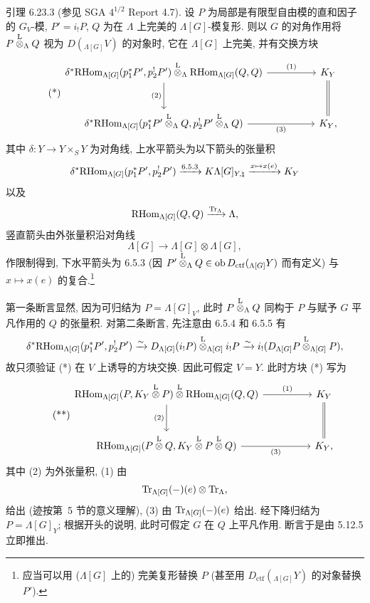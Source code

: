 \begin{statement}{引理 6.23.3}
(参见 SGA $4^{1/2}$ Report 4.7). 设 $P$ 为局部是有限型自由模的直和因子的 $G_V$-模, $P'=i_!P$, $Q$ 为在 $\Lambda$ 上完美的 $\Lambda[G]$-模复形. 则以 $G$ 的对角作用将 $P\overset{\mathrm L}{\otimes}_{\Lambda}Q$ 视为 $D({}_{\Lambda[G]}V)$ 的对象时, 它在 $\Lambda[G]$ 上完美, 并有交换方块
\begin{equation}\tag{*}
\begin{tikzcd}[column sep=huge,row sep=large]
\delta^*\RHom_{\Lambda[G]}(p_1^*P',p_2^!P')\lten_{\Lambda}
\RHom_{\Lambda[G]}(Q,Q) \arrow[r,"(1)"] \arrow[d,"(2)"']
& K_Y \arrow[d,equal]\\
\delta^*\RHom_{\Lambda[G]}(p_1^*P'\lten_{\Lambda}Q,p_2^!P'\lten_{\Lambda}Q) \arrow[r,"(3)"']
& K_Y ,
\end{tikzcd}
\end{equation}
其中 $\delta:Y\to Y\times_SY$ 为对角线, 上水平箭头为以下箭头的张量积
\[
\delta^*\mathrm{RHom}_{\Lambda[G]}(p_1^*P',p_2^!P')\xrightarrow{6.5.3}
K\Lambda[G]_{Y,\natural}\xrightarrow{x\mapsto x(e)}K_Y
\]
以及
\[
\mathrm{RHom}_{\Lambda[G]}(Q,Q)\xrightarrow{\operatorname{Tr}_{\Lambda}}\Lambda,
\]
竖直箭头由外张量积沿对角线
\[
\Lambda[G]\to\Lambda[G]\otimes\Lambda[G],
\]
作限制得到, 下水平箭头为 6.5.3 (因 $P'\overset{\mathrm L}{\otimes}_{\Lambda}Q\in\operatorname{ob} D_{\mathrm{ctf}}({}_{\Lambda[G]}Y)$ 而有定义) 与 $x\mapsto x(e)$ 的复合.\footnote{应当可以用 ($\Lambda[G]$ 上的) 完美复形替换 $P$ (甚至用 $D_{\mathrm{ctf}}({}_{\Lambda[G]}Y)$ 的对象替换 $P'$).}
\end{statement}

第一条断言显然, 因为可归结为 $P=\Lambda[G]_V$, 此时 $P\overset{\mathrm L}{\otimes}_{\Lambda}Q$ 同构于 $P$ 与赋予 $G$ 平凡作用的 $Q$ 的张量积. 对第二条断言, 先注意由 6.5.4 和 6.5.5 有
\[
\delta^*\mathrm{RHom}_{\Lambda[G]}(p_1^*P',p_2^!P')
\xrightarrow{\sim}
D_{\Lambda[G]}(i_!P)\overset{\mathrm L}{\otimes}_{\Lambda[G]} i_!P
\xrightarrow{\sim}
i_!(D_{\Lambda[G]}P\overset{\mathrm L}{\otimes}_{\Lambda[G]}P),
\]
故只须验证 (*) 在 $V$ 上诱导的方块交换. 因此可假定 $V=Y$. 此时方块 (*) 写为
\begin{equation}\tag{**}
\begin{tikzcd}[column sep=huge,row sep=large]
\RHom_{\Lambda[G]}(P,K_Y\lten P)\lten\RHom_{\Lambda[G]}(Q,Q) \arrow[r,"(1)"] \arrow[d,"(2)"']
& K_Y \arrow[d,equal]\\
\RHom_{\Lambda[G]}(P\lten Q,K_Y\lten P\lten Q) \arrow[r,"(3)"']
& K_Y ,
\end{tikzcd}
\end{equation}
其中 (2) 为外张量积, (1) 由
\[
\operatorname{Tr}_{\Lambda[G]}(-)(e)\otimes\operatorname{Tr}_{\Lambda},
\]
给出 (迹按第~5 节的意义理解), (3) 由 $\operatorname{Tr}_{\Lambda[G]}(-)(e)$ 给出. 经下降归结为 $P=\Lambda[G]_Y$; 根据开头的说明, 此时可假定 $G$ 在 $Q$ 上平凡作用. 断言于是由 5.12.5 立即推出.

